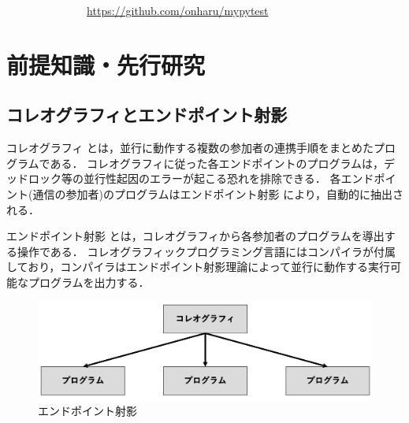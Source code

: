 \documentclass{thesis}
\begin{document}
$~~~~~~~~~~~~~~~~~~~~~~~~~~~~~~~~~$\url{https://github.com/onharu/mypytest}
\chapter{前提知識・先行研究}
\section{コレオグラフィとエンドポイント射影}
コレオグラフィ \cite{Choreographic}とは，並行に動作する複数の参加者の連携手順をまとめたプログラムである．
コレオグラフィに従った各エンドポイントのプログラムは，デッドロック等の並行性起因のエラーが起こる恐れを排除できる．
各エンドポイント(通信の参加者)のプログラムはエンドポイント射影 \cite{endpoint}により，自動的に抽出される．

エンドポイント射影 \cite{endpoint}とは，コレオグラフィから各参加者のプログラムを導出する操作である．
コレオグラフィックプログラミング言語にはコンパイラが付属しており，コンパイラはエンドポイント射影理論によって並行に動作する実行可能なプログラムを出力する．

\begin{figure}[H]
  \centering
  \includegraphics[scale=0.5]{image/epp.png}
  \caption{エンドポイント射影}
\end{figure}
\end{document}

